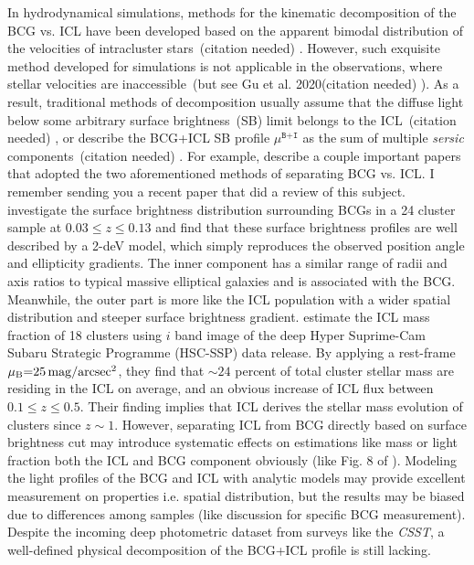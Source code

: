 \documentclass[fleqn,usenatbib]{mnras}
\newcommand{\mubi}{\mu^{\texttt{B+I}}}
\newcommand{\sbmag}{\mathrm{mag}/\mathrm{arcsec}^{2}}
\newcommand\ying[1]{{\color{red} {#1}}}
\newcommand\xkchen[1]{{\color{cyan} {#1}}}
\newcommand*\citeme{{\color{green}(citation needed)}}
\begin{document}
In hydrodynamical simulations, methods for the kinematic decomposition of
the BCG vs. ICL have been developed based on the apparent bimodal
distribution of the velocities of intracluster stars~\citeme \xkchen{\citep{Dolag2010, Puchwein2010, Cui2014} }.  However,
such exquisite method developed for simulations is not applicable in the
observations, where stellar velocities are inaccessible~(but see Gu et al.
2020\citeme \xkchen{\citep{Gu2020} }). As a result, traditional methods of decomposition usually
assume that the diffuse light below some arbitrary surface brightness~(SB)
limit belongs to the ICL~\citeme \xkchen{\citep{Rudick2011, Burke2012, Presotto2014, Tang2018, Furnell2021} }, or describe the BCG+ICL SB profile
$\mubi$ as the sum of multiple {\it sersic} components~\citeme \xkchen{\citep{Gonzalez2005, Seigar2007, Donzelli2011, Cooper2015, Zhang2019, Montes2021} }.  For
example, \ying{describe a couple important papers that adopted the two
aforementioned methods of separating BCG vs. ICL. I remember sending you a
recent paper that did a review of this subject.} \xkchen{\citep{Gonzalez2005} investigate the surface brightness distribution surrounding BCGs in a 24 cluster sample at $0.03 \leq z \leq 0.13$ and find that these surface brightness profiles are well described by a 2-deV model, which simply reproduces the observed position angle and ellipticity gradients. The inner component has a similar range of radii and axis ratios to typical massive elliptical galaxies and is associated with the BCG. Meanwhile, the outer part is more like the ICL population with a wider spatial distribution and steeper surface brightness gradient.  \citep{Furnell2021} estimate the ICL mass fraction of 18 clusters using $i$ band image of the deep Hyper Suprime-Cam Subaru Strategic Programme (HSC-SSP) data release. By applying a rest-frame $\mu_{\rm{B}}{=}25\,\sbmag$, they find that $\sim24$ percent of total cluster stellar mass are residing in the ICL on average, and an obvious increase of ICL flux between $0.1\leq z \leq 0.5$. Their finding implies that ICL derives the stellar mass evolution of clusters since $z \sim 1$. However, separating ICL from BCG directly based on surface brightness cut may introduce systematic effects on estimations like mass or light fraction both the ICL and BCG component obviously (like Fig. 8 of \citep{Furnell2021}). Modeling the light profiles of the BCG and ICL with analytic models may provide excellent measurement on properties i.e. spatial distribution, but the results may be biased due to differences among samples (like \citep{Gonzalez2005} discussion for specific BCG measurement).} Despite the incoming deep
photometric dataset from surveys like the {\it CSST}, a well-defined
physical decomposition of the BCG+ICL profile is still lacking.
\end{document}
